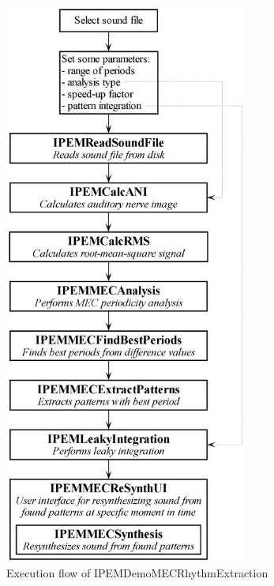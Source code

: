 \begin{figure}[!h]
    \centering
    \includegraphics[width=8cm]{Graphics/IPEMDemoMECRhythmExtractionChart}
    \caption{Execution flow of IPEMDemoMECRhythmExtraction}
    \label{Fig:IPEMDemoMECRhythmExtractionChart}
\end{figure}

